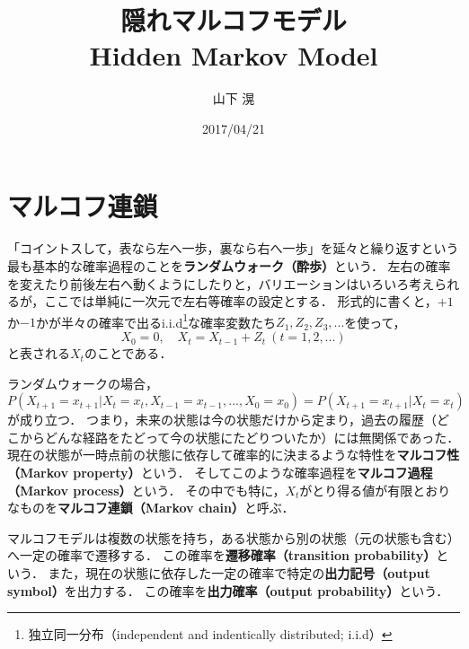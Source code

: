 \documentclass[a4j]{jarticle}
\title{隠れマルコフモデル \\ Hidden Markov Model}
\author{山下 滉}
\date{2017/04/21}
\begin{document}
\maketitle

\section{マルコフ連鎖}
「コイントスして，表なら左へ一歩，裏なら右へ一歩」を延々と繰り返すという最も基本的な確率過程のことを\textbf{ランダムウォーク（酔歩）}という．
左右の確率を変えたり前後左右へ動くようにしたりと，バリエーションはいろいろ考えられるが，ここでは単純に一次元で左右等確率の設定とする．
形式的に書くと，$+1$か$-1$かが半々の確率で出るi.i.d\footnote{独立同一分布（independent and indentically distributed; i.i.d）}な確率変数たち$Z_{1}, Z_{2}, Z_{3},...$を使って，
\begin{equation}
X_{0}=0, \quad X_{t} = X_{t-1} + Z_{t} \ (t=1,2,...) \label{eq:ranwark}
\end{equation}
と表される$X_{t}$のことである\cite{probability_statistics_for_programming}．

ランダムウォークの場合，
\begin{equation}
P(X_{t+1} = x_{t+1} | X_{t} = x_{t},X_{t-1} = x_{t-1}, ... , X_{0} = x_{0}) = P(X_{t+1}=x_{t+1}|X_{t} = x_{t}) \label{eq:markov}
\end{equation}
が成り立つ．
つまり，未来の状態は今の状態だけから定まり，過去の履歴（どこからどんな経路をたどって今の状態にたどりついたか）には無関係であった．
現在の状態が一時点前の状態に依存して確率的に決まるような特性を\textbf{マルコフ性（Markov property）}という．
そしてこのような確率過程を\textbf{マルコフ過程（Markov process）}という．
その中でも特に，$X_{t}$がとり得る値が有限とおりなものを\textbf{マルコフ連鎖（Markov chain）}と呼ぶ．

マルコフモデルは複数の状態を持ち，ある状態から別の状態（元の状態も含む）へ一定の確率で遷移する．
この確率を\textbf{遷移確率（transition probability）}という．
また，現在の状態に依存した一定の確率で特定の\textbf{出力記号（output symbol）}を出力する．
この確率を\textbf{出力確率（output probability）}という\cite{probability_statistics_for_programming}．
\end{document}
